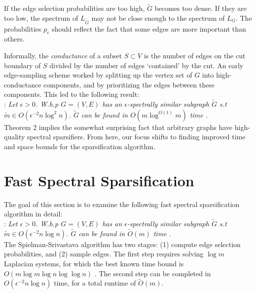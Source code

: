 \documentclass{article}
\begin{document}
If the edge selection probabilities are too high, $\tilde{G}$ becomes too
dense. If they are too low, the spectrum of $L_{\tilde{G}}$ may not be close
enough to the spectrum of $L_G$. The probabilities $p_e$ should reflect the
fact that some edges are more important than others.

Informally, the \textit{conductance} of a subset $S \subset V$ is the number
of edges on the cut boundary of $S$ divided by the number of edges
`contained' by the cut.  An early edge-sampling scheme worked by splitting
up the vertex set of $G$ into high-conductance components, and by
prioritizing the edges between these components. This led to the following
result: \\

\noindent
{}: \textit{Let $\epsilon > 0$. W.h.p $G =
(V, E)$ has an $\epsilon$-spectrally similar subgraph $\tilde{G}$ s.t
$\tilde{m} \in O(\epsilon^{-2}n\log^2 n)$. $\tilde{G}$ can be found in
$O(m\log^{O(1)}m)$ time \cite{SpielmanTeng} \cite{TheSurvey}.} \\

Theorem 2 implies the somewhat surprising fact that arbitrary graphs have
high-quality spectral sparsifiers. From here, our focus shifts to finding
improved time and space bounds for the sparsification algorithm.

\section{Fast Spectral Sparsification}

The goal of this section is to examine the following fast spectral
sparsification algorithm in detail: \\

\noindent
{}: \textit{Let $\epsilon > 0$.
W.h.p $G = (V, E)$ has an $\epsilon$-spectrally similar subgraph $\tilde{G}$
s.t $\tilde{m} \in O(\epsilon^{-2}n\log n)$. $\tilde{G}$ can be found in
$\tilde{O}(m)$ time \cite{SpielmanSrivastava} \cite{TheSurvey}.} \\

The Spielman-Srivastava algorithm has two stages: (1) compute edge selection
probabilities, and (2) sample edges. The first step requires solving $\log
m$ Laplacian systems, for which the best known time bound is $O(m \log m
\log n \log\log n)$ \cite{FastLaplacianSolver} \cite{TheSurvey}. The second
step can be completed in $O(\epsilon^{-2}n\log n)$ time, for a total runtime
of $\tilde{O}(m)$.
\end{document}
